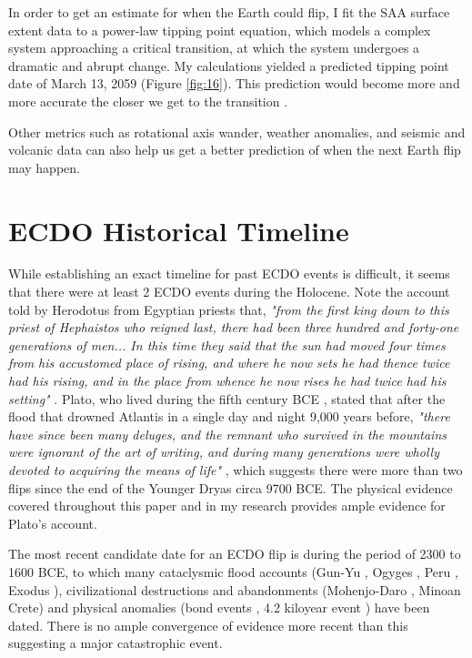 \documentclass[10pt,twocolumn,letterpaper]{article}
\begin{document}
In order to get an estimate for when the Earth could flip, I fit the SAA surface extent data to a power-law tipping point equation, which models a complex system approaching a critical transition, at which the system undergoes a dramatic and abrupt change. My calculations yielded a predicted tipping point date of March 13, 2059 (Figure \ref{fig:16}). This prediction would become more and more accurate the closer we get to the transition \cite{136}.

Other metrics such as rotational axis wander, weather anomalies, and seismic and volcanic data can also help us get a better prediction of when the next Earth flip may happen.

\section{ECDO Historical Timeline}

While establishing an exact timeline for past ECDO events is difficult, it seems that there were at least 2 ECDO events during the Holocene. Note the account told by Herodotus from Egyptian priests that, \textit{"from the first king down to this priest of Hephaistos who reigned last, there had been three hundred and forty-one generations of men... In this time they said that the sun had moved four times from his accustomed place of rising, and where he now sets he had thence twice had his rising, and in the place from whence he now rises he had twice had his setting"} \cite{32}. Plato, who lived during the fifth century BCE \cite{111}, stated that after the flood that drowned Atlantis in a single day and night 9,000 years before, \textit{"there have since been many deluges, and the remnant who survived in the mountains were ignorant of the art of writing, and during many generations were wholly devoted to acquiring the means of life"} \cite{112}, which suggests there were more than two flips since the end of the Younger Dryas circa 9700 BCE. The physical evidence covered throughout this paper and in my research \cite{2} provides ample evidence for Plato's account.

The most recent candidate date for an ECDO flip is during the period of 2300 to 1600 BCE, to which many cataclysmic flood accounts (Gun-Yu \cite{113,114,115}, Ogyges \cite{116,117}, Peru \cite{118,119}, Exodus \cite{120}), civilizational destructions and abandonments (Mohenjo-Daro \cite{121}, Minoan Crete\cite{100,101}) and physical anomalies (bond events \cite{122}, 4.2 kiloyear event \cite{90}) have been dated. There is no ample convergence of evidence more recent than this suggesting a major catastrophic event.
\end{document}
